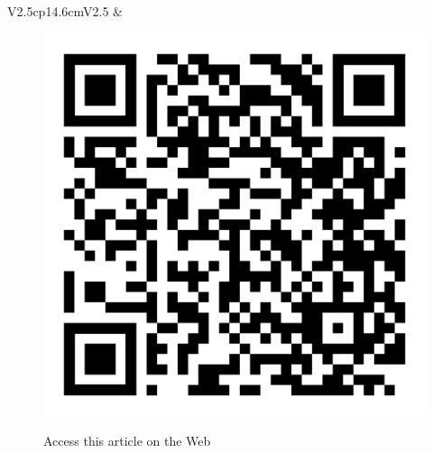 \begin{tabular}{V{2.5}cp{14.6cm}V{2.5}}
&\\
\end{tabular}

\vskip 1cm

\begin{figure}[H]
\centering
\includegraphics[scale=.15]{src/Figures/QR-codes/qr-code_non-orthogonal.png}

\medskip

{\large\sf Access this article on the Web}
\end{figure}

